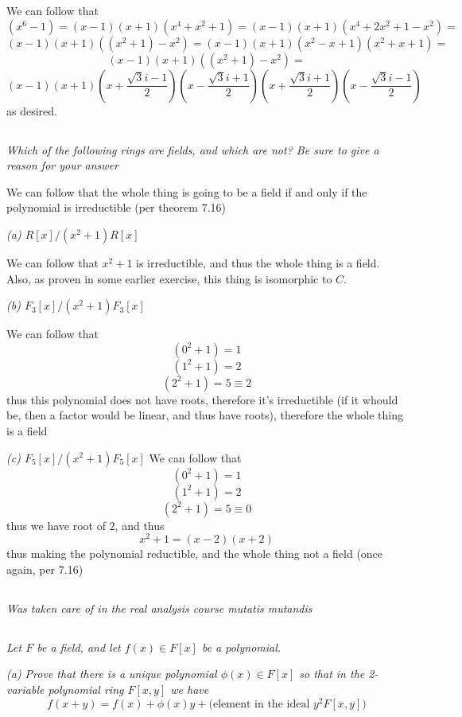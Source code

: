 \documentclass[11pt,oneside,titlepage]{book}
\begin{document}
We can follow that
$$(x^6 - 1) = (x - 1)(x + 1)(x^4 + x^2  + 1) = (x - 1)(x + 1)(x^4 + 2x^2  + 1 - x^2) = $$
$$ (x - 1)(x + 1)((x^2 + 1) - x^2) = (x - 1)(x + 1)(x^2 - x + 1)(x^2 + x + 1) = $$
$$ (x - 1)(x + 1)((x^2 + 1) - x^2) = $$
$$(x - 1)(x + 1)(x + \frac{\sqrt{3}i - 1}{2})
(x - \frac{\sqrt{3}i + 1}{2})(x + \frac{\sqrt{3}i + 1}{2})(x - \frac{\sqrt{3}i - 1}{2})
$$
as desired.

\subsection{}

\textit{Which of the following rings are fields, and which are not? Be sure to
  give a reason for your answer}

We can follow that the whole thing is going to be a field
if and only if the polynomial is irreductible (per theorem 7.16)

\textit{(a) $R[x]/(x^2 + 1)R[x]$}

We can follow that $x^2 + 1$ is irreductible, and thus the whole thing is a
field. Also, as proven in some earlier exercise, this thing is isomorphic
to $C$.

\textit{(b) $F_3[x]/(x^2 + 1)F_3[x]$}

We can follow that
$$(0^2 + 1)  = 1$$
$$(1^2 + 1)  = 2$$
$$(2^2 + 1)  = 5 \equiv 2$$
thus this polynomial does not have roots, therefore it's irreductible
(if it whould be, then a factor would be linear, and thus have roots),
therefore the whole thing is a field

\textit{(c) $F_5[x]/(x^2 + 1)F_5[x]$}
We can follow that
$$(0^2 + 1)  = 1$$
$$(1^2 + 1)  = 2$$
$$(2^2 + 1)  = 5 \equiv 0$$
thus we have root of $2$, and thus
$$x^2 + 1 = (x - 2)(x + 2)$$
thus making the polynomial reductible, and the whole thing not a field
(once again, per 7.16)

\subsection{}

\textit{Was taken care of in the real analysis course mutatis mutandis}

\subsection{}

\textit{Let $F$ be a field, and let $f(x) \in F[x]$ be a polynomial.}

\textit{(a) Prove that there is a unique polynomial $\phi(x) \in F[x]$
  so that in the 2-variable polynomial ring $F[x, y]$ we have
  $$f(x + y) = f(x) + \phi(x)y + \text{(element in the ideal $y^2F[x, y]$)}$$
}
\end{document}
